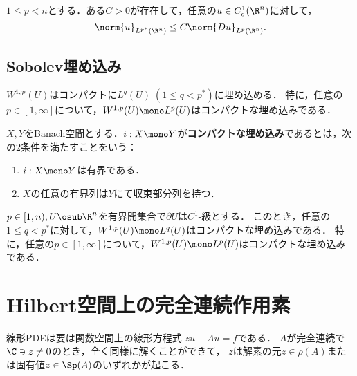 \documentclass[uplatex,dvipdfmx]{jsreport}
\begin{document}
\begin{theorem}
    $1\le p<n$とする．ある$C>0$が存在して，任意の$u\in C_c^1(\R^n)$に対して，
    \[\norm{u}_{L^{p^*}(\R^n)}\le C\norm{Du}_{L^p(\R^n)}.\]
\end{theorem}

\subsection{Sobolev埋め込み}

\begin{tcolorbox}[colframe=ForestGreen, colback=ForestGreen!10!white,breakable,colbacktitle=ForestGreen!40!white,coltitle=black,fonttitle=\bfseries\sffamily,
title=]
    $W^{1,p}(U)$はコンパクトに$L^q(U)\;(1\le q<p^*)$に埋め込める．
    特に，任意の$p\in[1,\infty]$について，$W^{1,p}(U)\mono L^p(U)$はコンパクトな埋め込みである．
\end{tcolorbox}

\begin{definition}
    $X,Y$をBanach空間とする．$i:X\mono Y$が\textbf{コンパクトな埋め込み}であるとは，次の2条件を満たすことをいう：
    \begin{enumerate}
        \item $i:X\mono Y$は有界である．
        \item $X$の任意の有界列は$Y$にて収束部分列を持つ．
    \end{enumerate}
\end{definition}

\begin{theorem}
    $p\in{[1,n)},U\osub\R^n$を有界開集合で$\partial U$は$C^1$-級とする．
    このとき，任意の$1\le q<p^*$に対して，$W^{1,p}(U)\mono L^q(U)$はコンパクトな埋め込みである．
    特に，任意の$p\in[1,\infty]$について，$W^{1,p}(U)\mono L^p(U)$はコンパクトな埋め込みである．
\end{theorem}

\section{Hilbert空間上の完全連続作用素}

\begin{tcolorbox}[colframe=ForestGreen, colback=ForestGreen!10!white,breakable,colbacktitle=ForestGreen!40!white,coltitle=black,fonttitle=\bfseries\sffamily,
title=]
    線形PDEは要は関数空間上の線形方程式
    $zu-Au=f$である．
    $A$が完全連続で$\C\ni z\ne0$のとき，全く同様に解くことができて，
    $z$は解素の元$z\in\rho(A)$または固有値$z\in\Sp(A)$のいずれかが起こる．
\end{tcolorbox}
\end{document}
